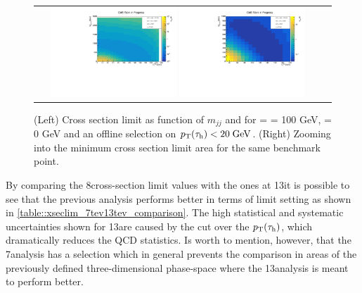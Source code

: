 \begin{figure}[tbh!]
	\centering
	\begin{tabular}{cc}
		\includegraphics[width=0.45\textwidth]{analysis/pics/JetInvMass_vs_MET_xsec_chi100_lsp000_taupt20.pdf}
		\includegraphics[width=0.45\textwidth]{analysis/pics/JetInvMass_vs_MET_xsec_chi100_lsp000_taupt20_zoom.pdf} 		
	\end{tabular}
	\caption{(Left) Cross section limit as function of $m_{jj}$ and \met for \charginopm = \neutralinotwo = 100 GeV, \neutralinoone = 0 GeV and an offline selection on $p_{\text{T}}(\tau_{\text{h}}) <  20\;\text{Ge}\kern-0.06667em\text{V}$. (Right) Zooming into the minimum cross section limit area for the same benchmark point.}
	\label{fig::xsec_lim_selected_results}
\end{figure}

By comparing the 8\tev cross-section limit values with the ones at 13\tev it is possible to see that the previous analysis performs better in terms of limit setting as shown in \autoref{table::xseclim_7tev13tev_comparison}. The high statistical and systematic uncertainties shown for 13\tev are caused by the cut over the $p_{\text{T}}(\tau_{\text{h}})$, which dramatically reduces the QCD statistics. Is worth to mention, however, that the 7\tev analysis has a selection which in general prevents the comparison in areas of the previously defined three-dimensional phase-space where the 13\tev analysis is meant to perform better.

